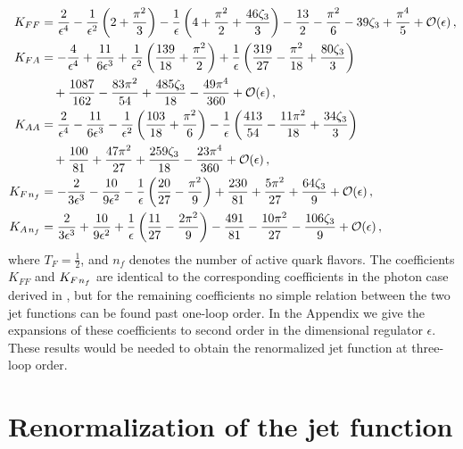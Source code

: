 \documentclass[12pt]{article}
\newcommand{\spac}{{\hspace{0.3mm}}}
\numberwithin{equation}{section}
\begin{document}
\begin{align}\label{eq:2.7}
   K_{FF} &= \frac{2}{\epsilon^4} - \frac{1}{\epsilon^2} \left( 2+\frac{\pi^2}{3} \right)
    - \frac{1}{\epsilon} \left( 4+\frac{\pi^2}{2}+\frac{46\zeta_3}{3} \right) 
    - \frac{13}{2} - \frac{\pi^2}{6}-39\zeta_3+\frac{\pi^4}{5} + {\cal O}(\epsilon) \,, \notag\\
   K_{FA} &= -\frac{4}{\epsilon^4} + \frac{11}{6\epsilon^3} 
    + \frac{1}{\epsilon^2} \left( \frac{139}{18}+\frac{\pi^2}{2} \right)
    + \frac{1}{\epsilon} \left( \frac{319}{27}-\frac{\pi^2}{18}+\frac{80\zeta_3}{3} \right) \notag\\
   &\quad + \frac{1087}{162} - \frac{83\pi^2}{54} + \frac{485\zeta_3}{18} - \frac{49\pi^4}{360} 
    + {\cal O}(\epsilon) \,, \notag\\
   K_{AA} &= \frac{2}{\epsilon^4} - \frac{11}{6\epsilon^3} 
    - \frac{1}{\epsilon^2} \left( \frac{103}{18}+\frac{\pi^2}{6} \right) 
    - \frac{1}{\epsilon} \left( \frac{413}{54}-\frac{11\pi^2}{18}+\frac{34\zeta_3}{3} \right) \\
   &\quad + \frac{100}{81} + \frac{47\pi^2}{27} + \frac{259\zeta_3}{18} - \frac{23\pi^4}{360} 
    + {\cal O}(\epsilon) \,, \notag\\
   K_{F\spac n_f} &= - \frac{2}{3\epsilon^3} - \frac{10}{9\epsilon^2} 
    - \frac{1}{\epsilon} \left( \frac{20}{27}-\frac{\pi^2}{9} \right) 
    + \frac{230}{81} + \frac{5\pi^2}{27} + \frac{64\zeta_3}{9} + {\cal O}(\epsilon) \,, \notag\\
   K_{A\spac n_f} &= \frac{2}{3\epsilon^3} + \frac{10}{9\epsilon^2}
    + \frac{1}{\epsilon} \left( \frac{11}{27}-\frac{2\pi^2}{9} \right)
    - \frac{491}{81} - \frac{10\pi^2}{27} - \frac{106\zeta_3}{9} + {\cal O}(\epsilon) \,, \notag
\end{align}
where $T_F=\frac12$, and $n_f$ denotes the number of active quark flavors. The coefficients $K_{FF}$ and $K_{F\spac n_f}$ are identical to the corresponding coefficients in the photon case derived in \cite{Liu:2020ydl}, but for the remaining coefficients no simple relation between the two jet functions can be found past one-loop order. In the Appendix we give the expansions of these coefficients to second order in the dimensional regulator $\epsilon$. These results would be needed to obtain the renormalized jet function at three-loop order.
	

\section{Renormalization of the jet function}
\end{document}
